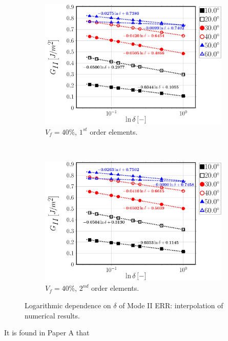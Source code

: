 \begin{figure}[!h]
    \begin{subfigure}[b]{0.45\textwidth}
        \includegraphics[width=\textwidth]{paperA/Vf40-free-1st-semilogvsDelta-GII.pdf}
       \caption{$V_{f}=40\%$, $1^{st}$ order elements.}
    \end{subfigure}
    ~
    \begin{subfigure}[b]{0.45\textwidth}
        \includegraphics[width=\textwidth]{paperA/Vf40-free-2nd-semilogvsDelta-GII.pdf}
       \caption{$V_{f}=40\%$, $2^{nd}$ order elements.}
    \end{subfigure}

\caption{Logarithmic dependence on $\delta$ of Mode II ERR: interpolation of numerical results.}\label{chap3:paperA:fig:gIIinterp}
\end{figure}

It is found in Paper A that

